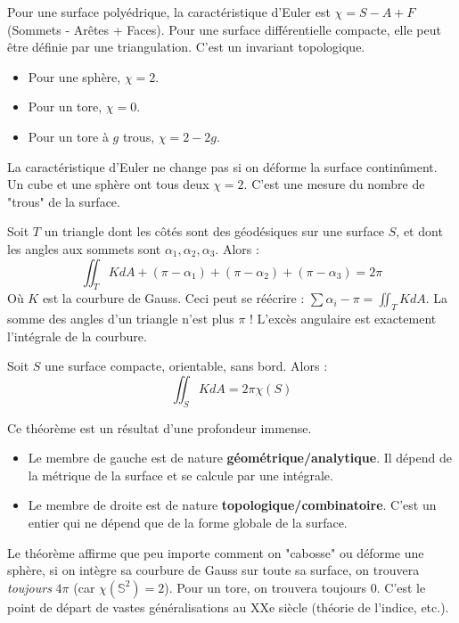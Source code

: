 \begin{definition}
    Pour une surface polyédrique, la caractéristique d'Euler est $\chi = S - A + F$ (Sommets - Arêtes + Faces). Pour une surface différentielle compacte, elle peut être définie par une triangulation. C'est un invariant topologique.
    \begin{itemize}
        \item Pour une sphère, $\chi = 2$.
        \item Pour un tore, $\chi = 0$.
        \item Pour un tore à $g$ trous, $\chi = 2 - 2g$.
    \end{itemize}
\end{definition}
\begin{remark}
    La caractéristique d'Euler ne change pas si on déforme la surface continûment. Un cube et une sphère ont tous deux $\chi=2$. C'est une mesure du nombre de "trous" de la surface.
\end{remark}

\begin{theorem}
    Soit $T$ un triangle dont les côtés sont des géodésiques sur une surface $S$, et dont les angles aux sommets sont $\alpha_1, \alpha_2, \alpha_3$. Alors :
    $$ \iint_T K dA + (\pi - \alpha_1) + (\pi - \alpha_2) + (\pi - \alpha_3) = 2\pi $$
    Où $K$ est la courbure de Gauss. Ceci peut se réécrire : $\sum \alpha_i - \pi = \iint_T K dA$.
    La somme des angles d'un triangle n'est plus $\pi$ ! L'excès angulaire est exactement l'intégrale de la courbure.
\end{theorem}

\begin{theorem}
    Soit $S$ une surface compacte, orientable, sans bord. Alors :
    $$ \iint_S K dA = 2\pi \chi(S) $$
\end{theorem}
\begin{remark}
    Ce théorème est un résultat d'une profondeur immense.
    \begin{itemize}
        \item Le membre de gauche est de nature \textbf{géométrique/analytique}. Il dépend de la métrique de la surface et se calcule par une intégrale.
        \item Le membre de droite est de nature \textbf{topologique/combinatoire}. C'est un entier qui ne dépend que de la forme globale de la surface.
    \end{itemize}
    Le théorème affirme que peu importe comment on "cabosse" ou déforme une sphère, si on intègre sa courbure de Gauss sur toute sa surface, on trouvera \textit{toujours} $4\pi$ (car $\chi(\mathbb{S}^2)=2$). Pour un tore, on trouvera toujours 0. C'est le point de départ de vastes généralisations au XXe siècle (théorie de l'indice, etc.).
\end{remark}